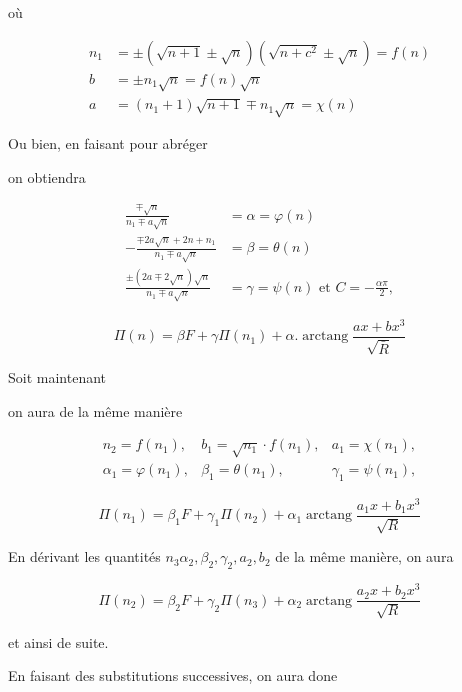 \documentclass{article}
\begin{document}
où

\[
\begin{aligned}
n_{1} & = \pm(\sqrt{n+1} \pm \sqrt{n})\left(\sqrt{n+c^{2}} \pm \sqrt{n}\right)=f(n) \\
b & = \pm n_{1} \sqrt{n}=f(n) \sqrt{n} \\
a & =\left(n_{1}+1\right) \sqrt{n+1} \mp n_{1} \sqrt{n}=\chi(n)
\end{aligned}
\]

Ou bien, en faisant pour abréger

on obtiendra

\[
\begin{aligned}
\frac{\mp \sqrt{n}}{n_{1} \mp a \sqrt{n}} & =\alpha=\varphi(n) \\
-\frac{\mp 2 a \sqrt{n}+2 n+n_{1}}{n_{1} \mp a \sqrt{n}} & =\beta=\theta(n) \\
\frac{ \pm(2 a \mp 2 \sqrt{n}) \sqrt{n}}{n_{1} \mp a \sqrt{n}} & =\gamma=\psi(n) \text { et } C=-\frac{\alpha \pi}{2},
\end{aligned}
\]

\[
\Pi(n)=\beta F+\gamma \Pi\left(n_{1}\right)+\alpha . \operatorname{arctang} \frac{a x+b x^{3}}{\sqrt{\bar{R}}}
\]

Soit maintenant

on aura de la même manière

\[
\begin{array}{lll}
n_{2}=f\left(n_{1}\right), & b_{1}=\sqrt{n_{1}} \cdot f\left(n_{1}\right), & a_{1}=\chi\left(n_{1}\right), \\
\alpha_{1}=\varphi\left(n_{1}\right), & \beta_{1}=\theta\left(n_{1}\right), & \gamma_{1}=\psi\left(n_{1}\right),
\end{array}
\]

\[
\Pi\left(n_{1}\right)=\beta_{1} F+\gamma_{1} \Pi\left(n_{2}\right)+\alpha_{1} \operatorname{arctang} \frac{a_{1} x+b_{1} x^{3}}{\sqrt{R}}
\]

En dérivant les quantités \(n_{3} \alpha_{2}, \beta_{2}, \gamma_{2}, a_{2}, b_{2}\) de la même manière, on aura

\[
\Pi\left(n_{2}\right)=\beta_{2} F+\gamma_{2} \Pi\left(n_{3}\right)+\alpha_{2} \operatorname{arctang} \frac{a_{2} x+b_{2} x^{3}}{\sqrt{R}}
\]

et ainsi de suite.

En faisant des substitutions successives, on aura done
\end{document}
